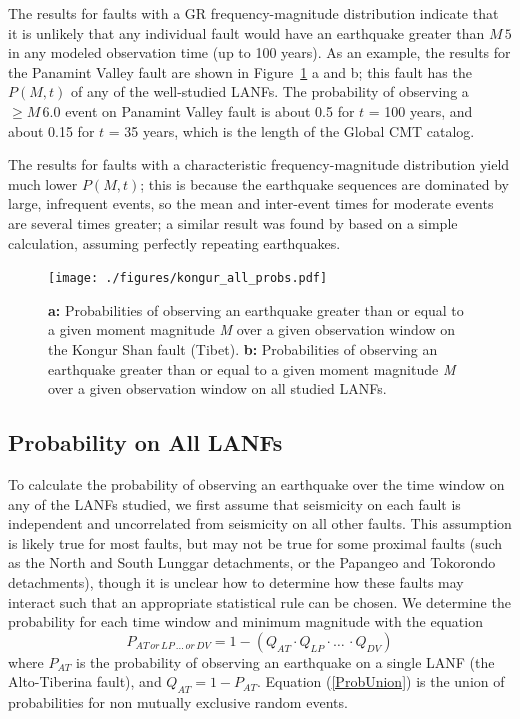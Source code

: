 \documentclass[twocolumn,grl]{AGUTeX}
\begin{document}
\begin{article}
The results for faults with a GR frequency-magnitude distribution
indicate that it is unlikely that any individual fault would have an earthquake
greater than $M \, 5$ in any modeled observation time (up to 100 years).  
As an example, the results for the Panamint Valley fault are shown in
Figure~\ref{fig:kongur_all_probs} a and b;
this fault has the $P(M,t)$ of any of the well-studied LANFs.  The
probability of observing a $\ge M \, 6.0$ event on Panamint Valley fault 
is about 0.5 for $t$ = 100 years, and about 0.15 for $t$ = 35 years, which is the length of the Global CMT catalog. 

The results for faults with a characteristic frequency-magnitude distribution
yield much lower $P(M,t)$; this is because the earthquake sequences are 
dominated by large, infrequent events, so the mean and inter-event times for
moderate events are several times greater; a similar result was found by
\citep{wernicke1995seis} based on a simple calculation, assuming perfectly
repeating earthquakes.
 
\begin{figure}[t!]
\noindent\texttt{[image: ./figures/kongur\_all\_probs.pdf]}
\caption{\textbf{a:} Probabilities of observing an earthquake greater than or equal to a given moment magnitude \emph{M} over a given observation window on the Kongur Shan fault (Tibet). \textbf{b:} Probabilities of observing an earthquake greater than or equal to a given moment magnitude \emph{M} over a given observation window on all studied LANFs. }
\label{fig:kongur_all_probs}
\end{figure}

\subsection{Probability on All LANFs}
To calculate the probability of observing an earthquake over the time
window on any of the LANFs studied, we first assume that seismicity on
each fault is independent and uncorrelated from seismicity on all
other faults. This assumption is likely true for most faults, but may
not be true for some proximal faults (such as the North and South
Lunggar detachments, or the Papangeo and Tokorondo detachments),
though it is unclear how to determine how these faults may interact 
such that an appropriate statistical rule can be chosen.  We
determine the probability for each time window and minimum magnitude
with the equation
\begin{equation}
P_{AT \, or \, LP\, \ldots \, or \, DV} = 1 - (Q_{AT} \cdot Q_{LP} \cdot \ldots \, \cdot Q_{DV})
\label{ProbUnion}
\end{equation}
where $P_{AT}$ is the probability of observing an earthquake on a
single LANF (the Alto-Tiberina fault), and $Q_{AT} = 1 -
P_{AT}$. Equation (\ref{ProbUnion}) is the union of probabilities for
non mutually exclusive random events.


\end{article}
\end{document}
